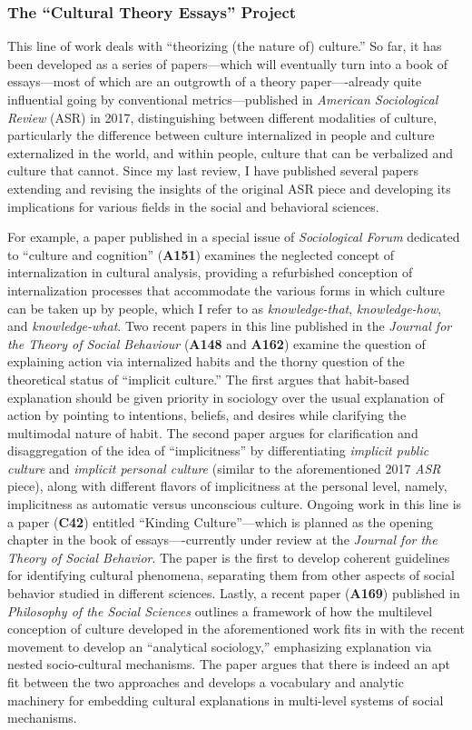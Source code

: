 \documentclass[a4paper,11pt]{extarticle}
\begin{document}
\subsubsection*{The ``Cultural Theory Essays'' Project}
This line of work deals with ``theorizing (the nature of) culture.'' So far, it has been developed as a series of papers---which will eventually turn into a book of essays---most of which are an outgrowth of a theory paper----already quite influential going by conventional metrics---published in \textit{American Sociological Review} (ASR) in 2017, distinguishing between different modalities of culture, particularly the difference between culture internalized in people and culture externalized in the world, and within people, culture that can be verbalized and culture that cannot. Since my last review, I have published several papers extending and revising the insights of the original ASR piece and developing its implications for various fields in the social and behavioral sciences. 

For example, a paper published in a special issue of \textit{Sociological Forum} dedicated to ``culture and cognition'' (\textbf{A151}) examines the neglected concept of internalization in cultural analysis, providing a refurbished conception of internalization processes that accommodate the various forms in which culture can be taken up by people, which I refer to as \textit{knowledge-that}, \textit{knowledge-how}, and \textit{knowledge-what}. Two recent papers in this line published in the \textit{Journal for the Theory of Social Behaviour} (\textbf{A148} and \textbf{A162}) examine the question of explaining action via internalized habits and the thorny question of the theoretical status of ``implicit culture.'' The first argues that habit-based explanation should be given priority in sociology over the usual explanation of action by pointing to intentions, beliefs, and desires while clarifying the multimodal nature of habit. The second paper argues for clarification and disaggregation of the idea of ``implicitness'' by differentiating \textit{implicit public culture} and \textit{implicit personal culture} (similar to the aforementioned 2017 \textit{ASR} piece), along with different flavors of implicitness at the personal level, namely, implicitness as automatic versus unconscious culture. Ongoing work in this line is a paper (\textbf{C42}) entitled ``Kinding Culture''---which is planned as the opening chapter in the book of essays----currently under review at the \textit{Journal for the Theory of Social Behavior}. The paper is the first to develop coherent guidelines for identifying cultural phenomena, separating them from other aspects of social behavior studied in different sciences. Lastly, a recent paper (\textbf{A169}) published in \textit{Philosophy of the Social Sciences} outlines a framework of how the multilevel conception of culture developed in the aforementioned work fits in with the recent movement to develop an ``analytical sociology,'' emphasizing explanation via nested socio-cultural mechanisms. The paper argues that there is indeed an apt fit between the two approaches and develops a vocabulary and analytic machinery for embedding cultural explanations in multi-level systems of social mechanisms. 
\end{document}

